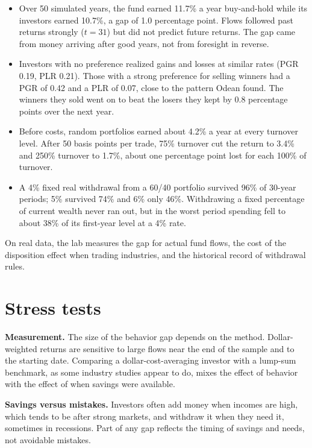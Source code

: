 \begin{itemize}
  \item Over 50 simulated years, the fund earned 11.7\% a year buy-and-hold while its investors earned 10.7\%, a gap of 1.0 percentage point. Flows followed past returns strongly ($t = 31$) but did not predict future returns. The gap came from money arriving after good years, not from foresight in reverse.
  \item Investors with no preference realized gains and losses at similar rates (PGR 0.19, PLR 0.21). Those with a strong preference for selling winners had a PGR of 0.42 and a PLR of 0.07, close to the pattern Odean found. The winners they sold went on to beat the losers they kept by 0.8 percentage points over the next year.
  \item Before costs, random portfolios earned about 4.2\% a year at every turnover level. After 50 basis points per trade, 75\% turnover cut the return to 3.4\% and 250\% turnover to 1.7\%, about one percentage point lost for each 100\% of turnover.
  \item A 4\% fixed real withdrawal from a 60/40 portfolio survived 96\% of 30-year periods; 5\% survived 74\% and 6\% only 46\%. Withdrawing a fixed percentage of current wealth never ran out, but in the worst period spending fell to about 38\% of its first-year level at a 4\% rate.
\end{itemize}

On real data, the lab measures the gap for actual fund flows, the cost of the disposition effect when trading industries, and the historical record of withdrawal rules.

\section{Stress tests}
\label{sec:24-stress}

\textbf{Measurement.} The size of the behavior gap depends on the method. Dollar-weighted returns are sensitive to large flows near the end of the sample and to the starting date. Comparing a dollar-cost-averaging investor with a lump-sum benchmark, as some industry studies appear to do, mixes the effect of behavior with the effect of when savings were available.

\textbf{Savings versus mistakes.} Investors often add money when incomes are high, which tends to be after strong markets, and withdraw it when they need it, sometimes in recessions. Part of any gap reflects the timing of savings and needs, not avoidable mistakes.

